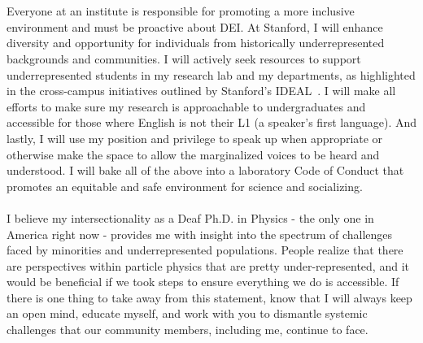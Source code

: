 \documentclass[10pt,a4paper,sans]{moderncv} %
\begin{document}
\\
\\
Everyone at an institute is responsible for promoting a more inclusive environment and must be proactive about DEI. At Stanford, I will enhance diversity and opportunity for individuals from historically underrepresented backgrounds and communities. I will actively seek resources to support underrepresented students in my research lab and my departments, as highlighted in the cross-campus initiatives outlined by Stanford's IDEAL~\cite{campusplan}. I will make all efforts to make sure my research is approachable to undergraduates and accessible for those where English is not their L1 (a speaker's first language). And lastly, I will use my position and privilege to speak up when appropriate or otherwise make the space to allow the marginalized voices to be heard and understood. I will bake all of the above into a laboratory Code of Conduct that promotes an equitable and safe environment for science and socializing.
\\
\\
I believe my intersectionality as a Deaf Ph.D. in Physics - the only one in America right now - provides me with insight into the spectrum of challenges faced by minorities and underrepresented populations. People realize that there are perspectives within particle physics that are pretty under-represented, and it would be beneficial if we took steps to ensure everything we do is accessible. If there is one thing to take away from this statement, know that I will always keep an open mind, educate myself, and work with you to dismantle systemic challenges that our community members, including me, continue to face.

\printbibliography
\end{document}
